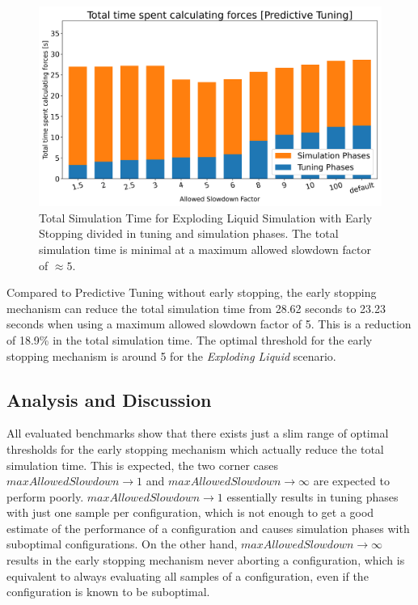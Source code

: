 \documentclass[conference]{IEEEtran}
\begin{document}
\begin{figure}[H]
    \centering

    \includegraphics[width=\columnwidth]{../data/explodingLiquid/cluster/predictiveTuning/analytics/total_time_average.png}

    \caption{Total Simulation Time for Exploding Liquid Simulation with Early Stopping divided in tuning and simulation phases. The total simulation time is minimal at a maximum allowed slowdown factor of $\approx5$.}
\end{figure}

Compared to Predictive Tuning without early stopping, the early stopping mechanism can reduce the total simulation time from 28.62 seconds to 23.23 seconds when using a maximum allowed slowdown factor of 5. This is a reduction of 18.9\% in the total simulation time. The optimal threshold for the early stopping mechanism is around 5 for the \textit{Exploding Liquid} scenario.


\subsection{Analysis and Discussion}

All evaluated benchmarks show that there exists just a slim range of optimal thresholds for the early stopping mechanism which actually reduce the total simulation time. This is expected, the two corner cases $maxAllowedSlowdown \to 1$ and $maxAllowedSlowdown \to \infty$ are expected to perform poorly. $maxAllowedSlowdown \to 1$ essentially results in tuning phases with just one sample per configuration, which is not enough to get a good estimate of the performance of a configuration and causes simulation phases with suboptimal configurations. On the other hand, $maxAllowedSlowdown \to \infty$ results in the early stopping mechanism never aborting a configuration, which is equivalent to always evaluating all samples of a configuration, even if the configuration is known to be suboptimal.
\end{document}
